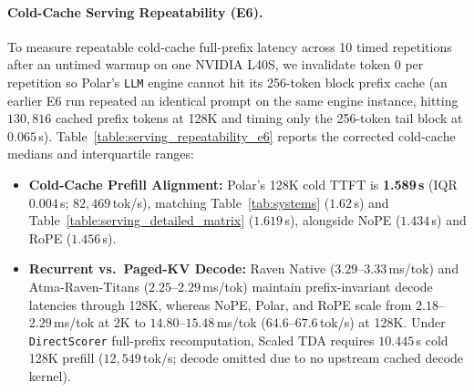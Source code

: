 \begin{revblock}
\paragraph{Cold-Cache Serving Repeatability (E6).}
To measure repeatable cold-cache full-prefix latency across 10 timed repetitions after an untimed warmup on one NVIDIA L40S, we invalidate token 0 per repetition so Polar's \texttt{LLM} engine cannot hit its 256-token block prefix cache (an earlier E6 run repeated an identical prompt on the same engine instance, hitting $130{,}816$ cached prefix tokens at 128K and timing only the 256-token tail block at $0.065$\,s). Table~\ref{table:serving_repeatability_e6} reports the corrected cold-cache medians and interquartile ranges:
\begin{itemize}
  \item \textbf{Cold-Cache Prefill Alignment:} Polar's 128K cold TTFT is \textbf{1.589\,s} (IQR $0.004$\,s; $82{,}469$\,tok/s), matching Table~\ref{tab:systems} ($1.62$\,s) and Table~\ref{table:serving_detailed_matrix} ($1.619$\,s), alongside NoPE ($1.434$\,s) and RoPE ($1.456$\,s).
  \item \textbf{Recurrent vs.\ Paged-KV Decode:} Raven Native ($3.29$--$3.33$\,ms/tok) and Atma-Raven-Titans ($2.25$--$2.29$\,ms/tok) maintain prefix-invariant decode latencies through 128K, whereas NoPE, Polar, and RoPE scale from $2.18$--$2.29$\,ms/tok at 2K to $14.80$--$15.48$\,ms/tok ($64.6$--$67.6$\,tok/s) at 128K. Under \texttt{DirectScorer} full-prefix recomputation, Scaled TDA requires $10.445$\,s cold 128K prefill ($12{,}549$\,tok/s; decode omitted due to no upstream cached decode kernel).
\end{itemize}


\end{revblock}
